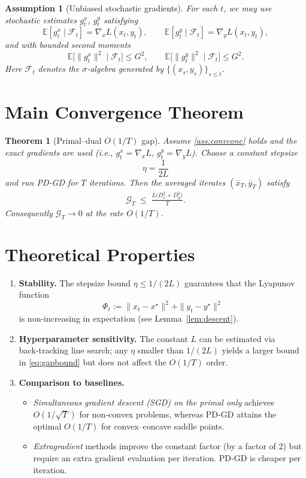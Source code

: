 \documentclass{article}
\newtheorem{theorem}{Theorem}
\newtheorem{assumption}{Assumption}
\begin{document}
\begin{assumption}[Unbiased stochastic gradients]\label{ass:stoch}
For each $t$, we may use stochastic estimates $g^x_t$, $g^y_t$ satisfying
\[
\mathbb{E}[g^x_t \mid \mathcal{F}_t]=\nabla_x L(x_t,y_t),\qquad 
\mathbb{E}[g^y_t \mid \mathcal{F}_t]=\nabla_y L(x_t,y_t),
\]
and with bounded second moments
\[
\mathbb{E}\bigl[\|g^x_t\|^2\mid\mathcal{F}_t\bigr]\le G^2,\qquad
\mathbb{E}\bigl[\|g^y_t\|^2\mid\mathcal{F}_t\bigr]\le G^2 .
\]
Here $\mathcal{F}_t$ denotes the $\sigma$‑algebra generated by $\{(x_s,y_s)\}_{s\le t}$.
\end{assumption}

\section*{Main Convergence Theorem}
\begin{theorem}[Primal–dual $O(1/T)$ gap]\label{thm:rate}
Assume \ref{ass:convconc} holds and the exact gradients are used (i.e., $g^x_t=\nabla_x L$, $g^y_t=\nabla_y L$).  
Choose a constant stepsize
\[
\boxed{\;\eta = \frac{1}{2L}\;}
\]
and run PD‑GD for $T$ iterations.  
Then the averaged iterates $(\bar x_T,\bar y_T)$ satisfy
\begin{align}
\mathcal{G}_T \;\le\; \frac{L\bigl(D_x^2+D_y^2\bigr)}{T}. \label{eq:gapbound}
\end{align}
Consequently $\mathcal{G}_T\to0$ at the rate $O(1/T)$.
\end{theorem}

\section*{Theoretical Properties}
\begin{enumerate}[label=\arabic*.]
\item \textbf{Stability.} The stepsize bound $\eta\le 1/(2L)$ guarantees that the Lyapunov function
\[
\Phi_t:=\|x_t-x^\star\|^2+\|y_t-y^\star\|^2
\]
is non‑increasing in expectation (see Lemma~\ref{lem:descent}).

\item \textbf{Hyperparameter sensitivity.} The constant $L$ can be estimated via back‑tracking line search; any $\eta$ smaller than $1/(2L)$ yields a larger bound in \eqref{eq:gapbound} but does not affect the $O(1/T)$ order.

\item \textbf{Comparison to baselines.}
    \begin{itemize}
    \item \emph{Simultaneous gradient descent (SGD) on the primal only} achieves $O(1/\sqrt{T})$ for non‑convex problems, whereas PD‑GD attains the optimal $O(1/T)$ for convex–concave saddle points.
    \item \emph{Extragradient} methods improve the constant factor (by a factor of $2$) but require an extra gradient evaluation per iteration. PD‑GD is cheaper per iteration.
    \end{itemize}
\end{enumerate}
\end{document}
